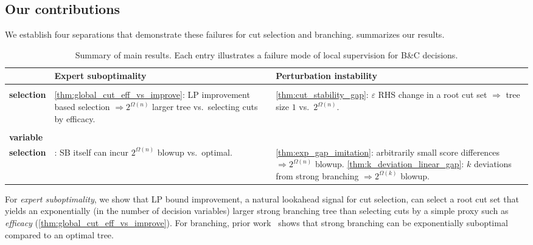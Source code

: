 \documentclass[smallextended,envcountsect]{svjour3} %
\newcommand{\0}{\mathbf{0}}
\newcommand{\1}{\mathbf{1}} %
\begin{document}
\subsection{Our contributions}
We establish four separations that demonstrate these failures for cut selection and branching.
 summarizes our results.

\begin{table}[t]
	\caption{Summary of main results. Each entry illustrates a failure mode of local supervision for B\&C decisions.}
	\label{tab:results_summary}
	\vskip 0.15in
	\centering
	{\small
		\setlength{\tabcolsep}{4pt}
		\renewcommand{\arraystretch}{1.3}
		\begin{tabularx}{\columnwidth}{@{}l>{\raggedright\arraybackslash}X>{\raggedright\arraybackslash}X@{}}
			\toprule
			& \textbf{Expert suboptimality} & \textbf{Perturbation instability} \\
				\midrule
				\makecell[tl]{\textbf{Cut}\\\textbf{selection}}
				& \cref{thm:global_cut_eff_vs_improve}: LP improvement based selection $\Rightarrow 2^{\Omega(n)}$ larger tree vs.\ selecting cuts by efficacy.
				& \cref{thm:cut_stability_gap}: $\varepsilon$ RHS change in a root cut set $\Rightarrow$ tree size $1$ vs.\ $2^{\Omega(n)}$.\\
			\addlinespace[2pt]
				\makecell[tl]{\textbf{Branching}\\\textbf{variable}\\\textbf{selection}}
				& \citet{dey2024theoretical}: SB itself can incur $2^{\Omega(n)}$ blowup vs.\ optimal.
				& \cref{thm:exp_gap_imitation}: arbitrarily small score differences $\Rightarrow 2^{\Omega(n)}$ blowup.\newline
				\cref{thm:k_deviation_linear_gap}: $k$ deviations from %
                strong branching
                $\Rightarrow 2^{\Omega(k)}$ blowup. \\
				\bottomrule
			\end{tabularx}}
	\vskip -0.1in
\end{table}

For \emph{expert suboptimality}, we show that LP bound improvement, a natural lookahead signal for cut selection, can select a root cut set that yields an exponentially (in the number of decision variables) larger  strong branching tree than selecting cuts by a simple proxy such as {\em efficacy} (\cref{thm:global_cut_eff_vs_improve}).
For branching, prior work~\citep{dey2024theoretical} shows that strong branching can be exponentially suboptimal compared to an optimal tree.
\end{document}
